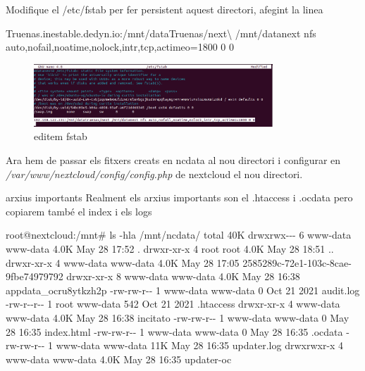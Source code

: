 \documentclass[
  10pt,
]{krantz}
\newenvironment{Shaded}{\begin{snugshade}}{\end{snugshade}}
\newcommand{\AttributeTok}[1]{\textcolor[rgb]{0.77,0.63,0.00}{#1}}
\newcommand{\DataTypeTok}[1]{\textcolor[rgb]{0.13,0.29,0.53}{#1}}
\newcommand{\ExtensionTok}[1]{#1}
\newcommand{\NormalTok}[1]{#1}
\begin{document}
Modifique el /etc/fstab per fer persistent aquest directori, afegint la linea

\begin{Shaded}
\begin{Highlighting}[]
\ExtensionTok{Truenas.inestable.dedyn.io:/mnt/dataTruenas/next}\DataTypeTok{\textbackslash{}}
\ExtensionTok{/mnt/datanext}\NormalTok{ nfs auto,nofail,noatime,nolock,intr,tcp,actimeo=1800 0 0}
\end{Highlighting}
\end{Shaded}

\begin{figure}
\centering
\includegraphics[width=0.8\textwidth,height=\textheight]{imatges/proxmox/next_fstab.png}
\caption{editem fstab}
\end{figure}

Ara hem de passar els fitxers creats en ncdata al nou directori i configurar en \emph{/var/www/nextcloud/config/config.php} de nextcloud el nou directori.

\begin{rmdcuidao}{arxius importants}
Realment els arxius importants son el .htaccess i .ocdata pero copiarem també el index i els logs

\end{rmdcuidao}

\begin{Shaded}
\begin{Highlighting}[]
\ExtensionTok{root@nextcloud:/mnt\#}\NormalTok{ ls }\AttributeTok{{-}hla}\NormalTok{ /mnt/ncdata/}
\ExtensionTok{total}\NormalTok{ 40K}
\ExtensionTok{drwxrwx{-}{-}{-}}\NormalTok{ 6 www{-}data www{-}data 4.0K May 28 17:52 .}
\ExtensionTok{drwxr{-}xr{-}x}\NormalTok{ 4 root     root     4.0K May 28 18:51 ..}
\ExtensionTok{drwxr{-}xr{-}x}\NormalTok{ 4 www{-}data www{-}data 4.0K May 28 17:05 2585289c{-}72e1{-}103c{-}8cae{-}9fbe74979792}
\ExtensionTok{drwxr{-}xr{-}x}\NormalTok{ 8 www{-}data www{-}data 4.0K May 28 16:38 appdata\_ocru8ytkzh2p}
\ExtensionTok{{-}rw{-}rw{-}r{-}{-}}\NormalTok{ 1 www{-}data www{-}data    0 Oct 21  2021 audit.log}
\ExtensionTok{{-}rw{-}r{-}{-}r{-}{-}}\NormalTok{ 1 root     www{-}data  542 Oct 21  2021 .htaccess}
\ExtensionTok{drwxr{-}xr{-}x}\NormalTok{ 4 www{-}data www{-}data 4.0K May 28 16:38 incitato}
\ExtensionTok{{-}rw{-}rw{-}r{-}{-}}\NormalTok{ 1 www{-}data www{-}data    0 May 28 16:35 index.html}
\ExtensionTok{{-}rw{-}rw{-}r{-}{-}}\NormalTok{ 1 www{-}data www{-}data    0 May 28 16:35 .ocdata}
\ExtensionTok{{-}rw{-}rw{-}r{-}{-}}\NormalTok{ 1 www{-}data www{-}data  11K May 28 16:35 updater.log}
\ExtensionTok{drwxrwxr{-}x}\NormalTok{ 4 www{-}data www{-}data 4.0K May 28 16:35 updater{-}oc}
\end{Highlighting}
\end{Shaded}
\end{document}
